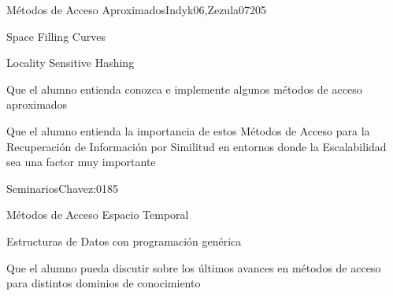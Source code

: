 \begin{syllabus}
\begin{unit}{Métodos de Acceso Aproximados}{Indyk06,Zezula07}{20}{5}
   \begin{topics}
         \item Space Filling Curves
         \item Locality Sensitive Hashing
   \end{topics}

   \begin{learningoutcomes}
         \item Que el alumno entienda conozca e implemente algunos métodos de acceso aproximados
         \item Que el alumno entienda la importancia de estos Métodos de Acceso para la Recuperación de Información por Similitud en entornos donde la Escalabilidad sea una factor muy importante
   \end{learningoutcomes}
\end{unit}

\begin{unit}{Seminarios}{Chavez:01}{8}{5}
	\begin{topics}
         \item Métodos de Acceso Espacio Temporal
         \item Estructuras de Datos con programación genérica
   \end{topics}

   \begin{learningoutcomes}
         \item Que el alumno pueda discutir sobre los últimos avances en métodos de acceso para distintos dominios de conocimiento
   \end{learningoutcomes}
\end{unit}



\begin{coursebibliography}
\end{coursebibliography}

\end{syllabus}
